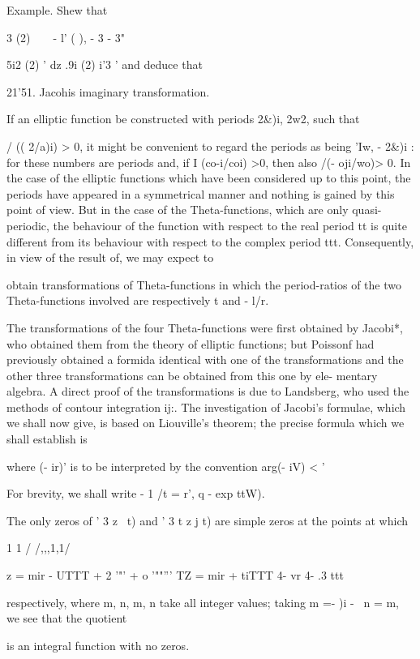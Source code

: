 Example. Shew that

  3 (2)\ \ \ \ - l' ( ), - 3 - 3"

5i2 (2) ' dz .9i (2) i'3 ' and deduce that

21'51. Jacohis imaginary transformation.

If an elliptic function be constructed with periods 2\&)i, 2w2, such
that

/ (( 2/a)i) > 0, it might be convenient to regard the periods as being
'Iw, - 2\&)i : for these numbers are periods and, if I (co-i/coi) >0,
then also /(- oji/wo)> 0. In the case of the elliptic functions which
have been considered up to this point, the periods have appeared in a
symmetrical manner and nothing is gained by this point of view. But in
the case of the Theta-functions, which are only quasi-periodic, the
behaviour of the function with respect to the real period tt is quite
different from its behaviour with respect to the complex period ttt.
Consequently, in view of the result of, we may expect to

%
%

obtain transformations of Theta-functions in which the period-ratios
of the two Theta-functions involved are respectively t and - l/r.

The transformations of the four Theta-functions were first obtained by
Jacobi*, who obtained them from the theory of elliptic functions; but
Poissonf had previously obtained a formida identical with one of the
transformations and the other three transformations can be obtained
from this one by ele- mentary algebra. A direct proof of the
transformations is due to Landsberg, who used the methods of contour
integration ij:. The investigation of Jacobi's formulae, which we
shall now give, is based on Liouville's theorem; the precise formula
which we shall establish is

where (- ir)' is to be interpreted by the convention arg(- iV) < '

For brevity, we shall write - 1 /t = r', q - exp ttW).

The only zeros of ' 3 z \ t) and ' 3 t z j t) are simple zeros at the
points at which

1 1 / /,,,1,1/

z = mir - UTTT + 2 '"' + o '""''' TZ = mir + tiTTT 4- vr 4- .3 ttt

respectively, where m, n, m, n take all integer values; taking m =- )i
- \, n = m, we see that the quotient

is an integral function with no zeros.

